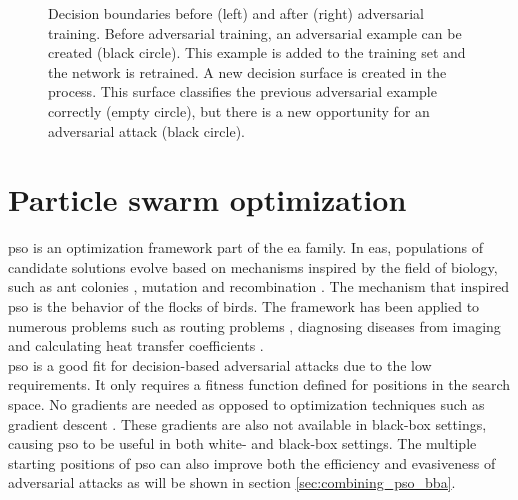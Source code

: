 \begin{figure}
\begin{tikzpicture}[x=0.75pt,y=0.75pt,yscale=-1,xscale=1]
\end{tikzpicture}
\caption[Adversarial training]{Decision boundaries before (left) and after (right) adversarial training. Before adversarial training, an adversarial example can be created (black circle). This example is added to the training set and the network is retrained. A new decision surface is created in the process. This surface classifies the previous adversarial example correctly (empty circle), but there is a new opportunity for an adversarial attack (black circle).}
\label{fig:adversarial_training}
\end{figure}


\section{Particle swarm optimization}\label{sec:pso}
\gls{pso} \cite{pso} is an optimization framework part of the \gls{ea} family. In \glspl{ea}, populations of candidate solutions evolve based on mechanisms inspired by the field of biology, such as ant colonies \cite{aco}, mutation and recombination \cite{genetic_algorithm}. The mechanism that inspired \gls{pso} is the behavior of the flocks of birds. The framework has been applied to numerous problems such as routing problems \cite{ev_transport, freight_transport}, diagnosing diseases from imaging \cite{leukemia_pso} and calculating heat transfer coefficients \cite{heat_transfer_pso}.\\

\gls{pso} is a good fit for decision-based adversarial attacks due to the low requirements. It only requires a fitness function defined for positions in the search space. No gradients are needed as opposed to optimization techniques such as gradient descent \cite{gradient_descent}. These gradients are also not available in black-box settings, causing \gls{pso} to be useful in both white- and black-box settings. The multiple starting positions of \gls{pso} can also improve both the efficiency and evasiveness of adversarial attacks as will be shown in section \ref{sec:combining_pso_bba}.\\

